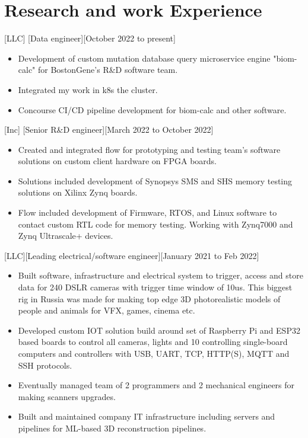 \documentclass{article}
\begin{document}
\section{Research and work Experience}


[LLC]
[Data engineer][October 2022 to present]
   \begin{itemize}
      \item Development of custom mutation database query microservice engine "biom-calc" for BostonGene's R\&D software team.
      \item Integrated my work in k8s the cluster.
      \item Concourse CI/CD pipeline development for biom-calc and other software.
    \end{itemize}  

[Inc]
[Senior R\&D engineer][March 2022 to October 2022]
   \begin{itemize}
      \item Created and integrated flow for prototyping and testing team's software solutions on custom client hardware on FPGA boards.
      \item Solutions included development of Synopsys SMS and SHS memory testing solutions on Xilinx Zynq boards.
      \item Flow included development of Firmware, RTOS, and Linux software to contact custom RTL code for memory testing. Working with Zynq7000 and Zynq Ultrascale+ devices.
   \end{itemize}  

[LLC][Leading electrical/software engineer][January 2021 to Feb 2022]
\begin{itemize}
   \item Built software, infrastructure and electrical system to trigger, access and store data for 240 DSLR cameras with trigger time window of 10us. This biggest rig in Russia was made for making top edge 3D photorealistic models of people and animals for VFX, games, cinema etc.
   \item Developed custom IOT solution build around set of Raspberry Pi and ESP32 based boards to control all cameras, lights and 10 controlling single-board computers and controllers with USB, UART, TCP, HTTP(S), MQTT and SSH protocols.
   \item Eventually managed team of 2 programmers and 2 mechanical engineers for making scanners upgrades.
   \item  Built and maintained company IT infrastructure including servers and pipelines for ML-based 3D reconstruction pipelines.
\end{itemize}
\end{document}
